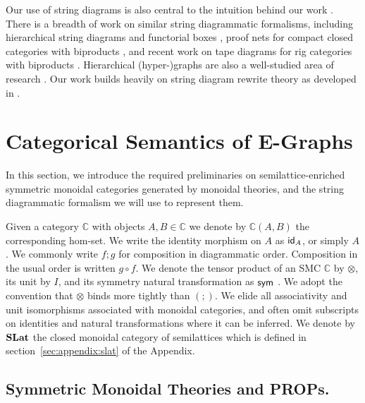 Our use of string diagrams is also central to the intuition behind our work \cite{Selinger_2010, joyal_geometry_1991}.  
There is a breadth of work on similar string diagrammatic formalisms,  including hierarchical string diagrams \cite{ghica-zanassi2023string} and functorial boxes \cite{mellies_functorial_2006},  proof nets for compact closed categories with biproducts \cite{duncan_generalised_2009}, and recent work on tape diagrams for rig categories with biproducts \cite{bonchi_tape_nodate}. 
Hierarchical (hyper-)graphs are also a well-studied area of research \cite{plump:hierarchical-graphs, montanari:gs-lambda, palacz:hierarchical-transform, Gaducci:hierarchical-graphs, Ghica:hierarchical}. 
Our work builds heavily on string diagram rewrite theory as developed in \cite{bonchi_string_2022-1,bonchi_string_2022-2, bonchi_string_2022-3}. 

\section{Categorical Semantics of E-Graphs}
In this section,  we introduce the required preliminaries on semilattice-enriched symmetric monoidal categories generated by monoidal theories,  and the string diagrammatic formalism we will use to represent them.  

Given a category $\mathbb{C}$  with objects $A,B \in \mathbb{C}$ we denote by $\mathbb{C}(A,B)$ the corresponding hom-set.  
We write the identity morphism on $A$ as $\textsf{id}_A$,  or simply $A$.  
We commonly write $f;g$ for composition in diagrammatic order.  
Composition in the usual order is written $g \circ f$.  
We denote the tensor product of an SMC $\mathbb{C}$ by $\otimes$,  its unit by $I$, and its symmetry natural transformation as $\textsf{sym}$ \cite{maclane}.  
We adopt the convention that $\otimes$ binds more tightly than $(;\!)$.  
We elide all associativity and unit isomorphisms associated with monoidal categories,  and often omit subscripts on identities and natural transformations where it can be inferred.  
We denote by $\mathbf{SLat}$ the closed monoidal category of semilattices which is defined in section~\ref{sec:appendix:slat} of the Appendix.


\subsection{Symmetric Monoidal Theories and PROPs.}

